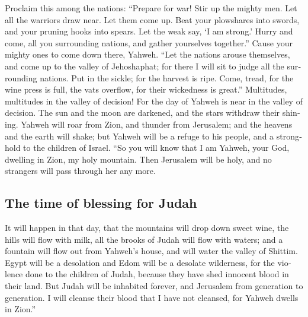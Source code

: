 \begin{paracol}{2}
\begin{otherlanguage}{english}
 Proclaim this among the nations: ``Prepare for war! Stir
up the mighty men. Let all the warriors draw near. Let them come up.
 Beat your plowshares into swords, and your pruning hooks
into spears. Let the weak say, `I am strong.'  Hurry and
come, all you surrounding nations, and gather yourselves together.''
Cause your mighty ones to come down there, Yahweh.  ``Let
the nations arouse themselves, and come up to the valley of Jehoshaphat;
for there I will sit to judge all the surrounding nations.
 Put in the sickle; for the harvest is ripe. Come, tread,
for the wine press is full, the vats overflow, for their wickedness is
great.''  Multitudes, multitudes in the valley of
decision! For the day of Yahweh is near in the valley of decision.
 The sun and the moon are darkened, and the stars
withdraw their shining.  Yahweh will roar from Zion, and
thunder from Jerusalem; and the heavens and the earth will shake; but
Yahweh will be a refuge to his people, and a stronghold to the children
of Israel.  ``So you will know that I am Yahweh, your
God, dwelling in Zion, my holy mountain. Then Jerusalem will be holy,
and no strangers will pass through her any more.

\hypertarget{the-time-of-blessing-for-judah}{%
\subsection{The time of blessing for
Judah}\label{the-time-of-blessing-for-judah}}

 It will happen in that day, that the mountains will drop
down sweet wine, the hills will flow with milk, all the brooks of Judah
will flow with waters; and a fountain will flow out from Yahweh's house,
and will water the valley of Shittim.  Egypt will be a
desolation and Edom will be a desolate wilderness, for the violence done
to the children of Judah, because they have shed innocent blood in their
land.  But Judah will be inhabited forever, and Jerusalem
from generation to generation.  I will cleanse their
blood that I have not cleansed, for Yahweh dwells in Zion.''
\end{otherlanguage} \end{paracol}
